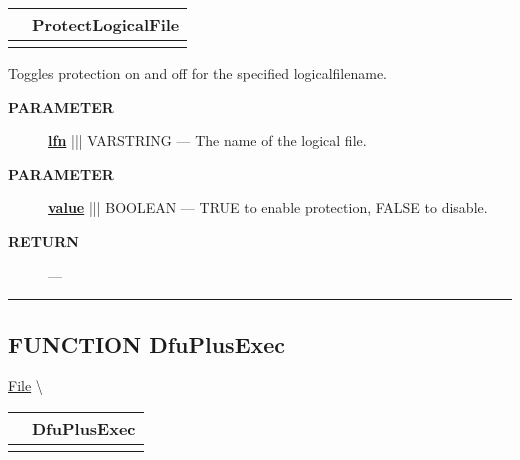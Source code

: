 {\renewcommand{\arraystretch}{1.5}
\begin{tabularx}{\textwidth}{|>{\raggedright\arraybackslash}l|X|}
\hline
\hspace{0pt}\mytexttt{\color{red} } & \textbf{ProtectLogicalFile} \\
\hline
\multicolumn{2}{|>{\raggedright\arraybackslash}X|}{\hspace{0pt}\mytexttt{\color{param} (varstring lfn, boolean value=TRUE)}} \\
\hline
\end{tabularx}
}

\par





Toggles protection on and off for the specified logicalfilename.






\par
\begin{description}
\item [\colorbox{tagtype}{\color{white} \textbf{\textsf{PARAMETER}}}] \textbf{\underline{lfn}} ||| VARSTRING --- The name of the logical file.
\item [\colorbox{tagtype}{\color{white} \textbf{\textsf{PARAMETER}}}] \textbf{\underline{value}} ||| BOOLEAN --- TRUE to enable protection, FALSE to disable.
\end{description}







\par
\begin{description}
\item [\colorbox{tagtype}{\color{white} \textbf{\textsf{RETURN}}}] \textbf{} --- 
\end{description}




\rule{\linewidth}{0.5pt}
\subsection*{\textsf{\colorbox{headtoc}{\color{white} FUNCTION}
DfuPlusExec}}

\hypertarget{ecldoc:file.dfuplusexec}{}
\hspace{0pt} \hyperlink{ecldoc:File}{File} \textbackslash 

{\renewcommand{\arraystretch}{1.5}
\begin{tabularx}{\textwidth}{|>{\raggedright\arraybackslash}l|X|}
\hline
\hspace{0pt}\mytexttt{\color{red} } & \textbf{DfuPlusExec} \\
\hline
\multicolumn{2}{|>{\raggedright\arraybackslash}X|}{\hspace{0pt}\mytexttt{\color{param} (varstring cmdline)}} \\
\hline
\end{tabularx}
}

